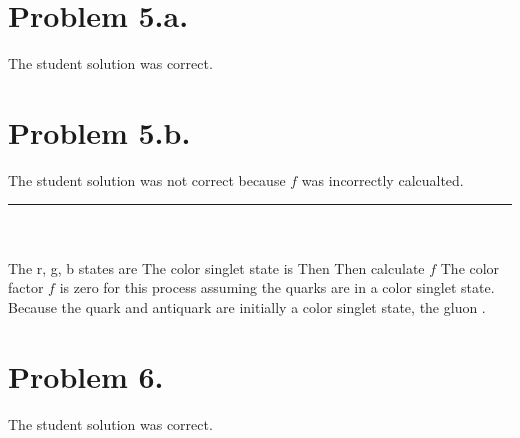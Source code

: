\documentclass{article}
\begin{document}
\section*{Problem 5.a.}
The student solution was correct.
\section*{Problem 5.b.}
The student solution was not correct because $f$ was incorrectly calcualted.\\
\hrule
~\\~\\
The r, g, b states are
The color singlet state is
Then
Then calculate $f$
The color factor $f$ is zero for this process assuming the quarks are in a color singlet state. Because the quark and antiquark are initially a color singlet state, the gluon .
\section*{Problem 6.}
The student solution was correct.
\end{document}
